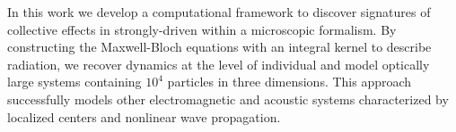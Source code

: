 In this work we develop a computational framework to discover signatures of collective effects in strongly-driven \qds{} within a microscopic formalism.
By constructing the Maxwell-Bloch equations with an integral kernel to describe radiation, we recover dynamics at the level of individual \qds{} and model optically large systems containing $10^4$ particles in three dimensions.
This approach successfully models other electromagnetic \cite{otherpapersfromshanker} and acoustic \cite{Glosser2016} systems characterized by localized centers and nonlinear wave propagation.

